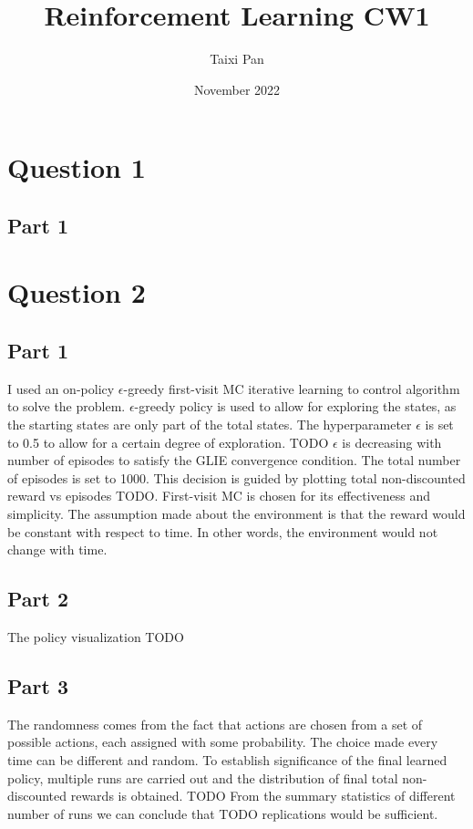 \documentclass{article}
\title{Reinforcement Learning CW1}
\author{Taixi Pan}
\date{November 2022}
\begin{document}
    \maketitle


    \section{Question 1}\label{sec:question-1}

    \subsection{Part 1}\label{subsec:part-1}


    \section{Question 2}\label{sec:question-2}

    \subsection{Part 1}\label{subsec:part-12}
    I used an on-policy $\epsilon$-greedy first-visit MC iterative learning to control algorithm to solve the problem.
    $\epsilon$-greedy policy is used to allow for exploring the states, as the starting states are only part of the total states.
    The hyperparameter $\epsilon$ is set to 0.5 to allow for a certain degree of exploration.
    TODO $\epsilon$ is decreasing with number of episodes to satisfy the GLIE convergence condition.
    The total number of episodes is set to 1000.
    This decision is guided by plotting total non-discounted reward vs episodes TODO.
    First-visit MC is chosen for its effectiveness and simplicity.
    The assumption made about the environment is that the reward would be constant with respect to time.
    In other words, the environment would not change with time.

    \subsection{Part 2}\label{subsec:part-2}
    The policy visualization TODO

    \subsection{Part 3}\label{subsec:part-3}
    The randomness comes from the fact that actions are chosen from a set of possible actions, each assigned with some probability.
    The choice made every time can be different and random.
    To establish significance of the final learned policy, multiple runs are carried out and the distribution of final total non-discounted rewards is obtained.
    TODO From the summary statistics of different number of runs we can conclude that TODO replications would be sufficient.
\end{document}

